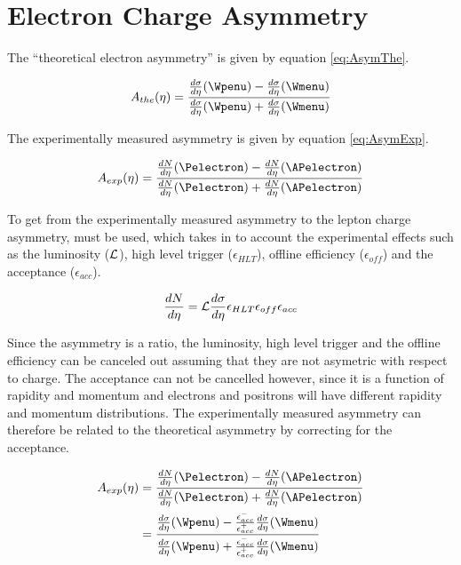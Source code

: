 \section{Electron Charge Asymmetry}

\cite{phenom} The ``theoretical electron asymmetry'' is given by equation
\ref{eq:AsymThe}.

\begin{equation}
A_{the}(\eta)=\frac{  \frac{d\sigma}{d\eta}(\Wpenu) -
\frac{d\sigma}{d\eta}(\Wmenu) }{ \frac{d\sigma}{d\eta}(\Wpenu) +
\frac{d\sigma}{d\eta}(\Wmenu) }
\label{eq:AsymThe}
\end{equation} 

The experimentally measured asymmetry is given by equation
\ref{eq:AsymExp}.\cite{kom}
 
\begin{equation}
A_{exp}(\eta)=\frac{  \frac{dN}{d\eta}(\Pelectron) -
\frac{dN}{d\eta}(\APelectron) }{ \frac{dN}{d\eta}(\Pelectron) +
\frac{dN}{d\eta}(\APelectron) }
\label{eq:AsymExp}
\end{equation} 

To get from the experimentally measured asymmetry to the lepton charge
asymmetry,  must be used, which takes in to
account the experimental effects such as the luminosity (${\cal L}$), high
level trigger ($\epsilon_{HLT}$), offline efficiency ($ \epsilon_{off}$) and
the acceptance ($\epsilon_{acc}$).

\begin{equation}
\frac{dN}{d\eta} = {\cal L } \frac{d\sigma}{d\eta}  \epsilon_{HLT}
\epsilon_{off} \epsilon_{acc}
\label{eq:NumEve}
\end{equation} 

Since the asymmetry is a ratio, the luminosity, high level trigger and the
offline efficiency can be canceled out assuming that they are not asymetric
with respect to charge.\cite{me} The acceptance can not be cancelled
however, since it is a function of rapidity and momentum and electrons and
positrons will have different rapidity and momentum distributions. The
experimentally measured asymmetry can therefore be related to the theoretical
asymmetry by correcting for the acceptance.\cite{me}

\begin{align} 
A_{exp}(\eta) &= \frac{ \frac{dN}{d\eta}(\Pelectron) -
\frac{dN}{d\eta}(\APelectron) }{ \frac{dN}{d\eta}(\Pelectron) +
\frac{dN}{d\eta}(\APelectron) }\\   
              &= \frac{ \frac{d\sigma}{d\eta}(\Wpenu) -
\frac{\epsilon^{-}_{acc}}{\epsilon^{+}_{acc}} \frac{d\sigma}{d\eta}(\Wmenu) }{
\frac{d\sigma}{d\eta}(\Wpenu) + \frac{\epsilon^{-}_{acc}}{\epsilon^{+}_{acc}}
\frac{d\sigma}{d\eta}(\Wmenu) }
\label{eq:AsymExpCorr}
\end{align}


